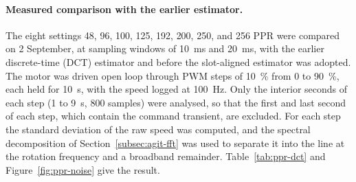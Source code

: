 \paragraph{Measured comparison with the earlier estimator.}
The eight settings 48, 96, 100, 125, 192, 200, 250, and 256 PPR were compared on 2 September, at sampling windows of 10~ms and 20~ms, with the earlier discrete-time (DCT) estimator and before the slot-aligned estimator was adopted. The motor was driven open loop through PWM steps of 10~\% from 0 to 90~\%, each held for 10~s, with the speed logged at 100~Hz. Only the interior seconds of each step (1 to 9~s, 800 samples) were analysed, so that the first and last second of each step, which contain the command transient, are excluded. For each step the standard deviation of the raw speed was computed, and the spectral decomposition of Section~\ref{subsec:agit-fft} was used to separate it into the line at the rotation frequency and a broadband remainder. Table~\ref{tab:ppr-dct} and Figure~\ref{fig:ppr-noise} give the result.

\begin{table}[htbp]
    \centering
    \caption[Resolution comparison with the earlier estimator]{Resolution comparison with the earlier (DCT) estimator, from the open-loop PWM sweeps of 2 September. SD is the standard deviation of the raw speed, $A_1$ the amplitude of the line at the rotation frequency, and noise the root-mean-square value of the remainder (Section~\ref{subsec:agit-fft}). The first six value columns are means over the nine steps from 10 to 90~\% PWM; the last two are the noise at the 10~\% step, about 220~rpm. All values in rpm.}
    \label{tab:ppr-dct}
    \small
\end{table}

